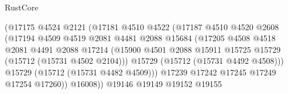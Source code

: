 \begin{lexlean}{RustCore}
\begin{coremodule}
                                          (@17175
                                            @4524
                                            @2121
                                            (@17181
                                              @4510
                                              @4522
                                              (@17187
                                                @4510
                                                @4520
                                                @2608
                                                (@17194
                                                  @4509
                                                  @4519
                                                  @2081
                                                  @4481
                                                  @2088
                                                  @15684
                                                  (@17205
                                                    @4508
                                                    @4518
                                                    @2081
                                                    @4491
                                                    @2088
                                                    @17214
                                                    (@15900
                                                      @4501
                                                      @2088
                                                      @15911
                                                      @15725
                                                      @15729
                                                      (@15712 (@15731 @4502 @2104)))
                                                    @15729
                                                    (@15712 (@15731 @4492 @4508)))
                                                  @15729
                                                  (@15712 (@15731 @4482 @4509)))
                                                @17239
                                                @17242
                                                @17245
                                                @17249
                                                @17254
                                                @17260))
                                            @16008))
                                        @19146
                                        @19149
                                        @19152
                                        @19155

\end{coremodule}
\end{lexlean}

